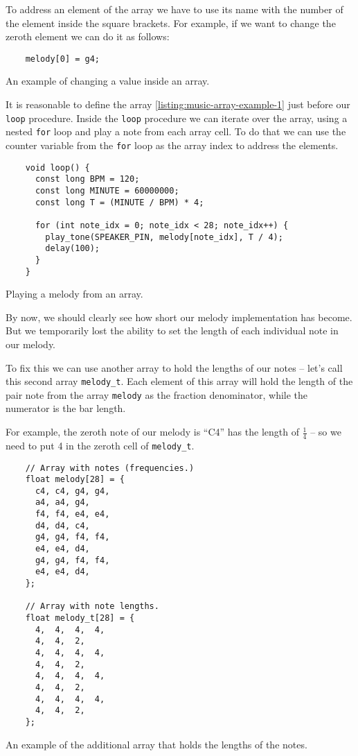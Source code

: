 \documentclass[../sparc.tex]{subfiles}
\begin{document}
To address an element of the array we have to use its name with the number of
the element inside the square brackets.  For example, if we want to change the
zeroth element we can do it as follows:

\begin{listing}[ht]
  \begin{verbatim}
    melody[0] = g4;
  \end{verbatim}
  \label{listing:music-array-example-2}
  \caption{An example of changing a value inside an array.}
\end{listing}

It is reasonable to define the array \ref{listing:music-array-example-1} just
before our \texttt{loop} procedure.  Inside the \texttt{loop} procedure we can
iterate over the array, using a nested \texttt{for} loop and play a note from
each array cell.  To do that we can use the counter variable from the
\texttt{for} loop as the array index to address the elements.


\begin{listing}[ht]
  \begin{verbatim}
    void loop() {
      const long BPM = 120;
      const long MINUTE = 60000000;
      const long T = (MINUTE / BPM) * 4;

      for (int note_idx = 0; note_idx < 28; note_idx++) {
        play_tone(SPEAKER_PIN, melody[note_idx], T / 4);
        delay(100);
      }
    }
  \end{verbatim}
  \label{listing:music-array-example-3}
  \caption{Playing a melody from an array.}
\end{listing}

By now, we should clearly see how short our melody implementation has become.
But we temporarily lost the ability to set the length of each individual note in
our melody.

To fix this we can use another array to hold the lengths of our notes -- let's
call this second array \texttt{melody\_t}.  Each element of this array will hold
the length of the pair note from the array \texttt{melody} as the fraction
denominator, while the numerator is the bar length.

For example, the zeroth note of our melody is ``C4'' has the length of
$\frac{1}{4}$ -- so we need to put 4 in the zeroth cell of \texttt{melody\_t}.

\begin{listing}[H]
  \begin{verbatim}
    // Array with notes (frequencies.)
    float melody[28] = {
      c4, c4, g4, g4,
      a4, a4, g4,
      f4, f4, e4, e4,
      d4, d4, c4,
      g4, g4, f4, f4,
      e4, e4, d4,
      g4, g4, f4, f4,
      e4, e4, d4,
    };

    // Array with note lengths.
    float melody_t[28] = {
      4,  4,  4,  4,
      4,  4,  2,
      4,  4,  4,  4,
      4,  4,  2,
      4,  4,  4,  4,
      4,  4,  2,
      4,  4,  4,  4,
      4,  4,  2,
    };
  \end{verbatim}
  \label{listing:music-array-example-4}
  \caption{An example of the additional array that holds the lengths of the
    notes.}
\end{listing}
\end{document}
